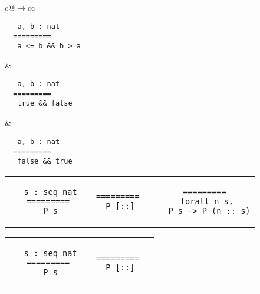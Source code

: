 \begin{landscape}
\begin{small}
\begin{multicols*}{3}[\begin{center}\section*{}\end{center}]
\begin{tabular}{c@{$\to$}cc}
\begin{minipage}{0.10\textwidth}
\begin{lstlisting}
   a, b : nat
  =========
   a <= b && b > a
  \end{lstlisting}\end{minipage}
  &
  \begin{minipage}{0.10\textwidth}\begin{lstlisting}
   a, b : nat
  =========
   true && false
  \end{lstlisting}\end{minipage}
  &
  \begin{minipage}{0.10\textwidth}\begin{lstlisting}
   a, b : nat
  =========
   false && true
  \end{lstlisting}\end{minipage}
  \end{tabular}

  \begin{tabular}{c@{$\to$}cc}
  \begin{minipage}{0.10\textwidth}\begin{lstlisting}
   s : seq nat
  =========
   P s
  \end{lstlisting}\end{minipage}
  &
  \begin{minipage}{0.08\textwidth}\begin{lstlisting}
  =========
   P [::]
  \end{lstlisting}\end{minipage}
  &
  \begin{minipage}{0.15\textwidth}\begin{lstlisting}
  =========
   forall n s,
    P s -> P (n :: s)
  \end{lstlisting}\end{minipage}
  \end{tabular}
  \begin{tabular}{c@{$\to$}cc}
  \begin{minipage}{0.10\textwidth}\begin{lstlisting}
   s : seq nat
  =========
   P s
  \end{lstlisting}\end{minipage}
  &
  \begin{minipage}{0.08\textwidth}\begin{lstlisting}
  =========
   P [::]
  \end{lstlisting}\end{minipage}
  &
  \begin{minipage}{0.12\textwidth}\begin{lstlisting}

\end{lstlisting}
\end{minipage}
\end{tabular}
\end{multicols*}
\end{small}
\end{landscape}

